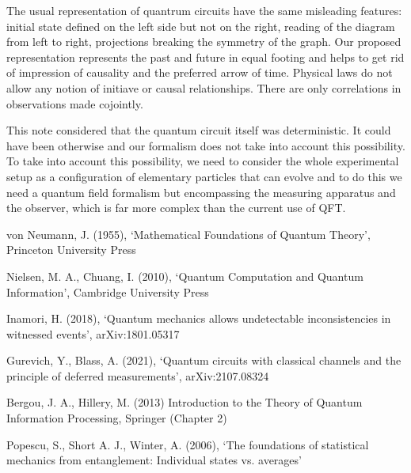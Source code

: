\documentclass[11pt,amsmath,amssymb,latexsym,a4paper]{article}
\begin{document}
The usual representation of quantrum circuits have the same misleading features: initial state defined on the left side but not on the right, reading of the diagram from left to right, projections breaking the symmetry of the graph. Our proposed representation represents the past and future in equal footing and helps to get rid of impression of causality and the preferred arrow of time. Physical laws do not allow any notion of initiave or causal relationships. There are only correlations in observations made cojointly.

This note considered that the quantum circuit itself was deterministic. It could have been otherwise and our formalism does not take into account this possibility. To take into account this possibility, we need to consider the whole experimental setup as a configuration of elementary particles that can evolve and to do this we need a quantum field formalism but encompassing the measuring apparatus and the observer, which is far more complex than the current use of QFT.

\begin{thebibliography}{}
 von Neumann, J. (1955), `Mathematical Foundations of Quantum Theory', Princeton University Press

 Nielsen, M. A., Chuang, I. (2010), `Quantum Computation and Quantum Information', Cambridge University Press

 Inamori, H. (2018), `Quantum mechanics allows undetectable inconsistencies in witnessed events', arXiv:1801.05317

 Gurevich, Y., Blass, A. (2021), `Quantum circuits with classical channels and the principle of deferred measurements', arXiv:2107.08324

 Bergou, J. A., Hillery, M. (2013) Introduction to the Theory of Quantum Information Processing, Springer (Chapter 2)

 Popescu, S., Short A. J., Winter, A. (2006), `The foundations of statistical mechanics from entanglement: Individual states vs. averages'

\end{thebibliography}
\end{document}
